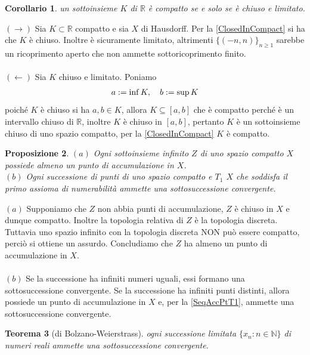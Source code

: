 \documentclass[oneside, 11pt]{amsbook}
\makeatletter
\newcommand{\0}{{(0)}}
\newcommand{\3}{{(3)}}
\theoremstyle{colonplain}
\newtheorem{thm}{Teorema}[chapter]
\newtheorem{prop}[thm]{Proposizione}
\newtheorem{cor}[thm]{Corollario}
\theoremstyle{colondefinition}
\theoremstyle{colonremark}
\numberwithin{equation}{chapter}
\renewcommand{\proofname}{Dimostrazione}
\renewenvironment{proof}[1][\proofname]{\par
  \pushQED{\qed}%
  \normalfont \topsep6\p@\@plus6\p@\relax
  \trivlist
  \item[\hskip\labelsep\bfseries #1:]\ignorespaces
}{%
  \popQED\endtrivlist\@endpefalse
}
\makeatother
\begin{document}
\begin{cor}\label{CompactR}
un sottoinsieme $K$ di $\mathbb{R}$ è compatto se e solo se è chiuso e limitato.
\end{cor}
\begin{proof}
$(\rightarrow)$ Sia $K \subset \mathbb{R}$ compatto e sia $X$ di Hausdorff. Per la \cref{ClosedInCompact} si ha che $K$ è chiuso. Inoltre è sicuramente limitato, altrimenti $\{ (-n, n) \}_{n \geq 1}$ sarebbe un ricoprimento aperto che non ammette sottoricoprimento finito. \\ \\
$(\leftarrow)$ Sia $K$ chiuso e limitato. Poniamo
\begin{align}
    a := \inf K, \quad b := \sup K \notag
\end{align}
poiché $K$ è chiuso si ha $a, b \in K$, allora $K \subseteq [a, b]$ che è compatto perché è un intervallo chiuso di $\mathbb{R}$, inoltre $K$ è chiuso in $[a, b]$, pertanto $K$ è un sottoinsieme chiuso di uno spazio compatto, per la \cref{ClosedInCompact} $K$ è compatto.
\end{proof}
\begin{prop}\label{InfSubsetAccPt}
$(a)$ Ogni sottoinsieme infinito $Z$ di uno spazio compatto $X$ possiede almeno un punto di accumulazione in $X$. \\
$(b)$ Ogni successione di punti di uno spazio compatto e $T_1$ $X$ che soddisfa il primo assioma di numerabilità ammette una sottosuccessione convergente.
\end{prop}
\begin{proof}
$(a)$ Supponiamo che $Z$ non abbia punti di accumulazione, $Z$ è chiuso in $X$ e dunque compatto. Inoltre la topologia relativa di $Z$ è la topologia discreta. Tuttavia uno spazio infinito con la topologia discreta NON può essere compatto, perciò si ottiene un assurdo. Concludiamo che $Z$ ha almeno un punto di accumulazione in $X$. \\ \\
$(b)$ Se la successione ha infiniti numeri uguali, essi formano una sottosuccessione convergente. Se la successione ha infiniti punti distinti, allora possiede un punto di accumulazione in $X$ e, per la \cref{SeqAccPtT1}, ammette una sottosuccessione convergente.
\end{proof}
\begin{thm}[di Bolzano-Weierstrass]
ogni successione limitata $\{ x_n : n \in \mathbb{N} \}$ di numeri reali ammette una sottosuccessione convergente.
\end{thm}
\end{document}
